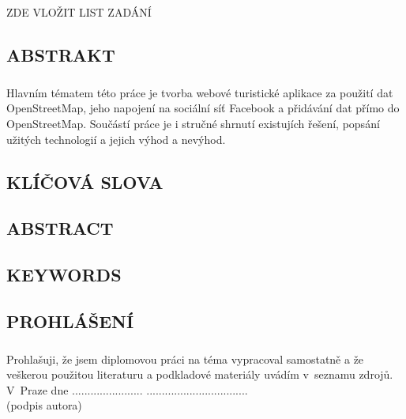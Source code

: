 \documentclass[11pt,a4paper,titlepage,oneside]{book}
\begin{document}
\newpage %
	\begin{center}
		\vspace*{15cm}
		{\Large ZDE VLOŽIT LIST ZADÁNÍ}
	\end{center}

\begin{flushleft}
	\chapter*{}
	\section*{ABSTRAKT}
	\paragraph{} Hlavním tématem této práce je tvorba webové turistické aplikace za použití dat OpenStreetMap, jeho napojení na sociální síť Facebook a přidávání dat přímo do OpenStreetMap. Součástí práce je i stručné shrnutí existujích řešení, popsání užitých technologií a jejich výhod a nevýhod.
	\section*{KLÍČOVÁ SLOVA}
	{}
	\section*{ABSTRACT}
	\paragraph{}
	\section*{KEYWORDS}
	{\sc{}}
\end{flushleft}

\newpage %
	\vspace*{15cm}
	\section*{\Large PROHLÁŠENÍ}
		\paragraph{}Prohlašuji, že jsem diplomovou práci na téma  vypracoval samostatně a že veškerou použitou literaturu a podkladové materiály uvádím v~seznamu zdrojů.\\[1cm]
	V~Praze dne ....................... ................................. \\
	 {(podpis autora)\hspace{0.25cm} }
	
\end{document}
